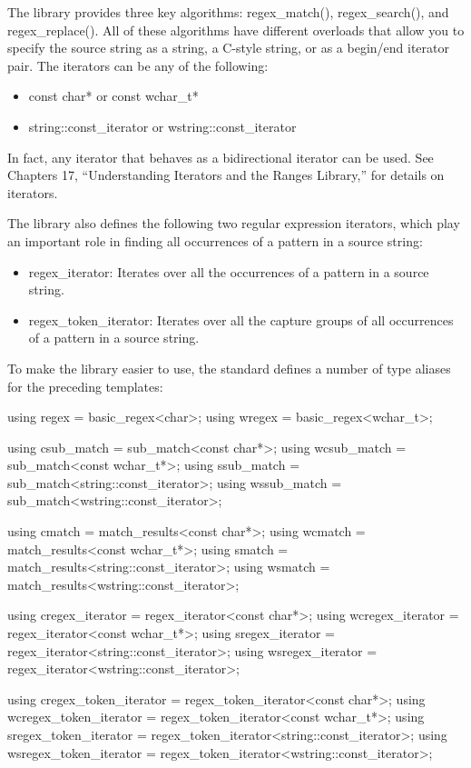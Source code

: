 The library provides three key algorithms: regex\_match(), regex\_search(), and regex\_replace(). All of these algorithms have different overloads that allow you to specify the source string as a string, a C-style string, or as a begin/end iterator pair. The iterators can be any of the following:

\begin{itemize}
\item
const char* or const wchar\_t*

\item
string::const\_iterator or wstring::const\_iterator
\end{itemize}

In fact, any iterator that behaves as a bidirectional iterator can be used. See Chapters 17, “Understanding Iterators and the Ranges Library,” for details on iterators.

The library also defines the following two regular expression iterators, which play an important role in finding all occurrences of a pattern in a source string:

\begin{itemize}
\item
regex\_iterator: Iterates over all the occurrences of a pattern in a source string.

\item
regex\_token\_iterator: Iterates over all the capture groups of all occurrences of a pattern in a source string.
\end{itemize}

To make the library easier to use, the standard defines a number of type aliases for the preceding templates:

\begin{cpp}
using regex = basic_regex<char>;
using wregex = basic_regex<wchar_t>;

using csub_match = sub_match<const char*>;
using wcsub_match = sub_match<const wchar_t*>;
using ssub_match = sub_match<string::const_iterator>;
using wssub_match = sub_match<wstring::const_iterator>;

using cmatch = match_results<const char*>;
using wcmatch = match_results<const wchar_t*>;
using smatch = match_results<string::const_iterator>;
using wsmatch = match_results<wstring::const_iterator>;

using cregex_iterator = regex_iterator<const char*>;
using wcregex_iterator = regex_iterator<const wchar_t*>;
using sregex_iterator = regex_iterator<string::const_iterator>;
using wsregex_iterator = regex_iterator<wstring::const_iterator>;

using cregex_token_iterator = regex_token_iterator<const char*>;
using wcregex_token_iterator = regex_token_iterator<const wchar_t*>;
using sregex_token_iterator = regex_token_iterator<string::const_iterator>;
using wsregex_token_iterator = regex_token_iterator<wstring::const_iterator>;
\end{cpp}

